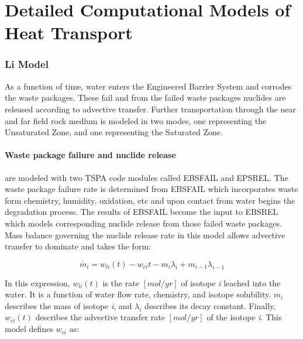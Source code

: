 \section{Detailed Computational Models of Heat Transport}
\label{sec:detailed_heat}







\subsubsection{Li Model\cite{li_methodology_2006}} As a function of time, water
enters the Engineered Barrier System and corrodes the waste packages.  These
fail and from the failed waste packages nuclides are released according to
advective transfer.  Further transportation through the near and far field rock
medium is modeled in two modes, one representing the Unsaturated Zone, and one
representing the Saturated Zone.

\paragraph{Waste package failure and nuclide release} are modeled with two TSPA
code modules called EBSFAIL and EPSREL. The waste package failure rate is
determined from EBSFAIL which incorporates waste form chemistry, humidity,
oxidation, etc and upon contact from water begins the degradation process. The
results of EBSFAIL become the input to EBSREL which models corresponding
nuclide release from those failed waste packages. Mass balance governing the
nuclide release rate in this model allows advective transfer to dominate and
takes the form:

\begin{equation}
\dot{m_i}=w_{li}(t)-w_{ci}{t}-m_i\lambda_i+m_{i-1}\lambda_{i-1}\nonumber
\end{equation}

In this expression, $w_{li}(t)$ is the rate $[mol/yr]$ of isotope \emph{i}
leached into the water.  It is a function of water flow rate, chemistry, and
isotope solubility. $m_i$ describes the mass of isotope \emph{i}, and
$\lambda_i$ describes its decay constant. Finally, $w_{ci}(t)$ describes the
advective transfer rate $[mol/yr]$ of the isotope \emph{i}. This model defines
$w_{ci}$ as:

